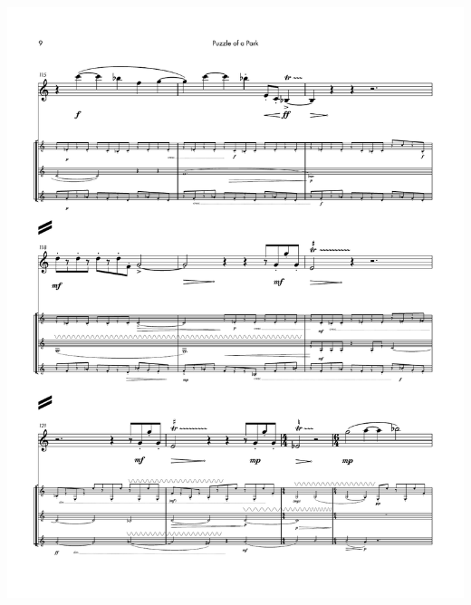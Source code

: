     \begin{center}
    \includegraphics[scale=0.75]{Scores/puzzlePart14.pdf}
    \end{center}
    \newpage

